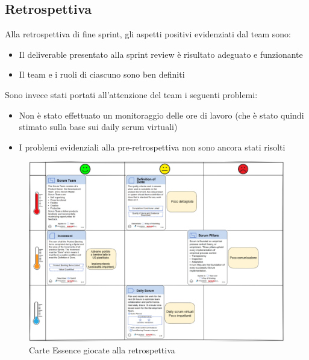 \documentclass[11pt]{article}
\begin{document}
\subsection*{Retrospettiva}
Alla retrospettiva di fine sprint, gli aspetti positivi evidenziati dal team sono:
\begin{itemize}
    \item Il deliverable presentato alla sprint review è risultato adeguato e funzionante
    \item Il team e i ruoli di ciascuno sono ben definiti
\end{itemize}
Sono invece stati portati all'attenzione del team i seguenti problemi:
\begin{itemize}
    \item Non è stato effettuato un monitoraggio delle ore di lavoro (che è stato quindi stimato sulla base sui daily scrum virtuali)
    \item I problemi evidenziali alla pre-retrospettiva non sono ancora stati risolti 
\end{itemize}
\begin{figure}[H]
    \centering
    \includegraphics[width=12cm]{./img/retrospettiva.png}
    \caption{Carte Essence giocate alla retrospettiva}
\end{figure}
\end{document}

